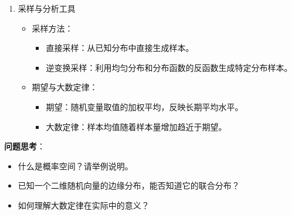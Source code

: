 \documentclass{article}
\theoremstyle{remark}
\theoremstyle{definition}
\theoremstyle{plain}
\numberwithin {equation}{section}
\numberwithin{assumption}{section}
\begin{document}
\begin{enumerate}
\begin{itemize}
        \begin{itemize}
          \item 随机向量：由多个随机变量构成的向量形式 $\mathbf{X} = (X_1, X_2, \dots, X_n)$，用于描述多维随机现象。
          \item 联合分布函数：$F(x_1, \dots, x_n) = P(X_1 \le x_1, \dots, X_n \le x_n)$，描述多维随机变量联合取值的概率。
          \item 联合概率密度函数：对应于连续型随机向量，描述多维空间中某点附近的联合概率密度。
        \end{itemize}
      \item 条件概率与边际分布：
        \begin{itemize}
          \item 边际分布：通过对联合分布中的部分变量求和或积分得到的单变量分布。
          \item 条件概率：在已知某事件发生的条件下，另一个事件发生的概率。
          \item 贝叶斯公式：$P(A|B) = \frac{P(B|A)P(A)}{P(B)}$，用于根据先验概率和数据的新信息计算后验概率。
          \item 随机变量的独立性：若两随机变量的联合分布等于其边缘分布的乘积，则称二者相互独立。
        \end{itemize}
    \end{itemize}
  \item 采样与分析工具
    \begin{itemize}
      \item 采样方法：
        \begin{itemize}
          \item 直接采样：从已知分布中直接生成样本。
          \item 逆变换采样：利用均匀分布和分布函数的反函数生成特定分布样本。
        \end{itemize}
      \item 期望与大数定律：
        \begin{itemize}
          \item 期望：随机变量取值的加权平均，反映长期平均水平。
          \item 大数定律：样本均值随着样本量增加趋近于期望。
        \end{itemize}
    \end{itemize}
\end{enumerate}

\textbf{问题思考}：

\begin{itemize}
  \item 什么是概率空间？请举例说明。
  \item 已知一个二维随机向量的边缘分布，能否知道它的联合分布？
  \item 如何理解大数定律在实际中的意义？
\end{itemize}
\end{document}
